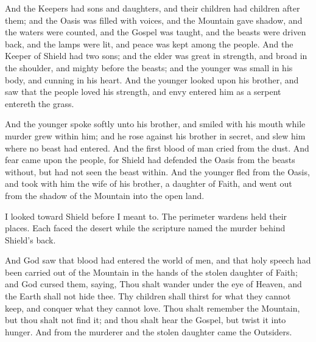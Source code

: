 \begin{scripture}
And the Keepers had sons and daughters, and their children had children after them; and the Oasis was filled with voices, and the Mountain gave shadow, and the waters were counted, and the Gospel was taught, and the beasts were driven back, and the lamps were lit, and peace was kept among the people. And the Keeper of Shield had two sons; and the elder was great in strength, and broad in the shoulder, and mighty before the beasts; and the younger was small in his body, and cunning in his heart. And the younger looked upon his brother, and saw that the people loved his strength, and envy entered him as a serpent entereth the grass.
\end{scripture}

\begin{scripture}
And the younger spoke softly unto his brother, and smiled with his mouth while murder grew within him; and he rose against his brother in secret, and slew him where no beast had entered. And the first blood of man cried from the dust. And fear came upon the people, for Shield had defended the Oasis from the beasts without, but had not seen the beast within. And the younger fled from the Oasis, and took with him the wife of his brother, a daughter of Faith, and went out from the shadow of the Mountain into the open land.
\end{scripture}

I looked toward Shield before I meant to. The perimeter wardens held their places. Each faced the desert while the scripture named the murder behind Shield's back.\par

\begin{scripture}
And God saw that blood had entered the world of men, and that holy speech had been carried out of the Mountain in the hands of the stolen daughter of Faith; and God cursed them, saying, Thou shalt wander under the eye of Heaven, and the Earth shall not hide thee. Thy children shall thirst for what they cannot keep, and conquer what they cannot love. Thou shalt remember the Mountain, but thou shalt not find it; and thou shalt hear the Gospel, but twist it into hunger. And from the murderer and the stolen daughter came the Outsiders.
\end{scripture}

